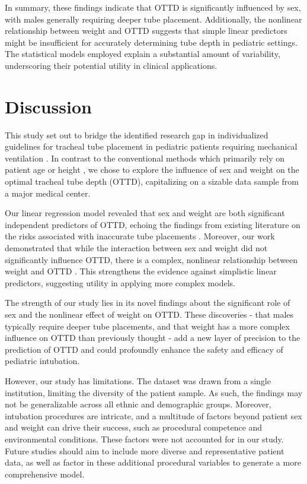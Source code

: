\documentclass[11pt]{article}
\begin{document}
In summary, these findings indicate that OTTD is significantly influenced by sex, with males generally requiring deeper tube placement. Additionally, the nonlinear relationship between weight and OTTD suggests that simple linear predictors might be insufficient for accurately determining tube depth in pediatric settings. The statistical models employed explain a substantial amount of variability, underscoring their potential utility in clinical applications.

\section*{Discussion}

This study set out to bridge the identified research gap in individualized guidelines for tracheal tube placement in pediatric patients requiring mechanical ventilation \cite{Wolfler2011DailyPO,Matava2020PediatricAM}. In contrast to the conventional methods which primarily rely on patient age or height \cite{Foronda2011TheIO,Principi2011ComplicationsOM,Weiss2005AppropriatePO}, we chose to explore the influence of sex and weight on the optimal tracheal tube depth (OTTD), capitalizing on a sizable data sample from a major medical center.

Our linear regression model revealed that sex and weight are both significant independent predictors of OTTD, echoing the findings from existing literature on the risks associated with inaccurate tube placements \cite{Fiadjoe2016AirwayMC,Lau2017LessIS}. Moreover, our work demonstrated that while the interaction between sex and weight did not significantly influence OTTD, there is a complex, nonlinear relationship between weight and OTTD \cite{Bond2019ACE,Wen2023AssociationBW}. This strengthens the evidence against simplistic linear predictors, suggesting utility in applying more complex models.

The strength of our study lies in its novel findings about the significant role of sex and the nonlinear effect of weight on OTTD. These discoveries - that males typically require deeper tube placements, and that weight has a more complex influence on OTTD than previously thought - add a new layer of precision to the prediction of OTTD and could profoundly enhance the safety and efficacy of pediatric intubation.

However, our study has limitations. The dataset was drawn from a single institution, limiting the diversity of the patient sample. As such, the findings may not be generalizable across all ethnic and demographic groups. Moreover, intubation procedures are intricate, and a multitude of factors beyond patient sex and weight can drive their success, such as procedural competence and environmental conditions. These factors were not accounted for in our study. Future studies should aim to include more diverse and representative patient data, as well as factor in these additional procedural variables to generate a more comprehensive model.
\end{document}
